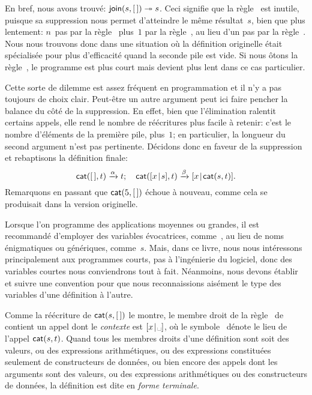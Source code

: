 En bref, nous avons trouvé: \(\textsf{join}(s,[\,]) \twoheadrightarrow s\).
Ceci signifie que la règle~\clause{\beta} est inutile, puisque sa
suppression nous permet d'atteindre le même résultat~\(s\), bien que
plus lentement: \(n\)~pas par la règle~\clause{\gamma} plus~\(1\) par
la règle~\clause{\alpha}, au lieu d'un pas par la
règle~\clause{\beta}. Nous nous trouvons donc dans une situation où la
définition originelle était spécialisée pour plus d'efficacité quand
la seconde pile est vide. Si nous ôtons la règle~\clause{\beta}, le
programme est plus court mais devient plus lent dans ce cas
particulier.

Cette sorte de dilemme est assez fréquent en programmation et il n'y a
pas toujours de choix clair. Peut-être un autre argument peut ici
faire pencher la balance du côté de la suppression. En effet, bien que
l'élimination ralentit certains appels, elle rend le nombre de
réécritures plus facile à retenir: c'est le nombre d'éléments de la
première pile, plus~\(1\); en particulier, la longueur du second
argument n'est pas pertinente. Décidons donc en faveur de la
suppression et rebaptisons la définition finale:
\begin{equation*}
\textsf{cat}([\,],t) \xrightarrow{\alpha} t;\quad
\textsf{cat}([{x}\!\mid\!{s}],t) \xrightarrow{\beta} [{x}\!\mid\!{\textsf{cat}(s,t)}].
\end{equation*}
Remarquons en passant que \(\textsf{cat}(5,[\,])\) échoue à nouveau, comme
cela se produisait dans la version originelle.

Lorsque l'on programme des applications moyennes ou grandes, il est
recommandé d'employer des variables évocatrices,
comme~, au lieu de noms énigmatiques ou
génériques, comme~\(s\). Mais, dans ce livre, nous nous intéressons
principalement aux programmes courts, pas à l'ingénierie du logiciel,
donc des variables courtes nous conviendrons tout à fait. Néanmoins,
nous devons établir et suivre une convention pour que nous
reconnaissions aisément le type des variables d'une définition à
l'autre.


Comme la réécriture de \(\textsf{cat}(s,[\,])\) le montre, le membre droit
de la règle~\clause{\beta} de  contient un appel dont le
\emph{contexte} est \(\cons{x}{\text{\textvisiblespace}}\), où le
symbole~\textvisiblespace{} dénote le lieu de l'appel
\(\textsf{cat}(s,t)\). Quand tous les membres droits d'une définition
sont soit des valeurs, ou des expressions arithmétiques, ou des
expressions constituées seulement de constructeurs de données, ou bien
encore des appels dont les arguments sont des valeurs, ou des
expressions arithmétiques ou des constructeurs de données, la
définition est dite en \emph{forme terminale}.

